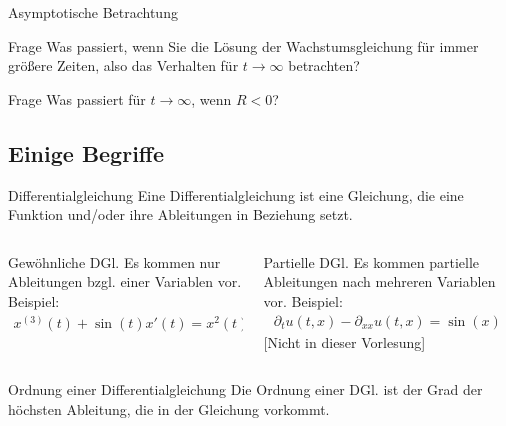 \begin{frame}{Asymptotische Betrachtung}
  \begin{exampleblock}{Frage}
    Was passiert, wenn Sie die Lösung der Wachstumsgleichung für immer
    größere Zeiten, also das Verhalten für $t\to\infty$ betrachten?
  \end{exampleblock}

  \begin{exampleblock}{Frage}
    Was passiert für $t\to\infty$, wenn $R<0$?
  \end{exampleblock}
\end{frame}
\subsection{Einige Begriffe}
\frame{\subtoc}
\begin{frame}
  \begin{block}{Differentialgleichung}
    Eine Differentialgleichung ist eine Gleichung, die eine Funktion
    und/oder ihre Ableitungen in Beziehung setzt.
  \end{block}
  \begin{columns}
    \begin{column}[t]{.5\textwidth}
      \begin{block}{Gewöhnliche DGl.}
        Es kommen nur Ableitungen bzgl. einer Variablen vor. Beispiel:
        \begin{gather*}
          x^{(3)}(t) + \sin(t) x'(t) = x^2(t) +t^2
        \end{gather*}
      \end{block}
    \end{column}
    \begin{column}[t]{.5\textwidth}
      \begin{block}{Partielle DGl.}
        Es kommen partielle Ableitungen nach mehreren Variablen vor.
        Beispiel:
        \begin{gather*}
          \partial_t u(t,x) - \partial_{xx} u(t,x) = \sin(x)
        \end{gather*}
      [Nicht in dieser Vorlesung]
      \end{block}
    \end{column}
  \end{columns}
  \pause
  \begin{block}{Ordnung einer Differentialgleichung}
    Die Ordnung einer DGl. ist der Grad der höchsten Ableitung, die in
    der Gleichung vorkommt.
  \end{block}
\end{frame}

